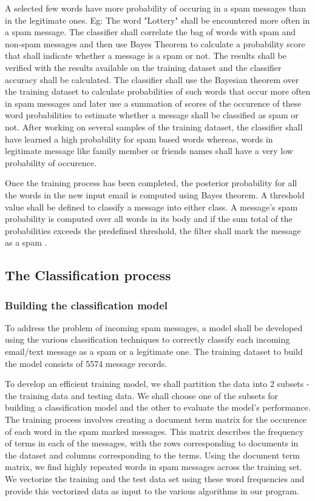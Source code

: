\documentclass[9pt,twocolumn,twoside]{../../styles/osajnl}
\begin{document}
A selected few words have more probability of occuring in a spam
messages than in the legitimate ones. Eg: The word "Lottery" shall be
encountered more often in a spam message.  The classifier shall
correlate the bag of words with spam and non-spam messages and then
use Bayes Theorem to calculate a probability score that shall indicate
whether a message is a spam or not. The results shall be verified with
the results available on the training dataset and the classifier
accuracy shall be calculated.  The classifier shall use the Bayesian
theorem over the training dataset to calculate probabilities of such
words that occur more often in spam messages and later use a summation
of scores of the occurence of these word probabilities to estimate
whether a message shall be classified as spam or not. After working on
several samples of the training dataset, the classifier shall have
learned a high probability for spam based words whereas, words in
legitimate message like family member or friends names shall have a
very low probability of occurence.

Once the training process has been completed, the posterior
probability for all the words in the new input email is computed using
Bayes theorem. A threshold value shall be defined to classify a
message into either class. A message's spam probability is computed
over all words in its body and if the sum total of the probabilities
exceeds the predefined threshold, the filter shall mark the message as
a spam \cite{www-wiki-naivebayes}.

\subsection{The Classification process}

\subsubsection{Building the classification model}

To address the problem of incoming spam messages, a model shall be
developed using the various classification techniques to correctly
classify each incoming email/text message as a spam or a legitimate
one. The training dataset to build the
model consists of 5574 message records.

To develop an efficient training model, we shall partition the data
into 2 subsets - the training data and testing data. We shall choose
one of the subsets for building a classification model and the other
to evaluate the model's performance. The training process involves
creating a document term matrix for the occurence of each word in the
spam marked messages. This matrix describes the frequency of terms in
each of the messages, with the rows corresponding to documents in the
dataset and columns corresponding to the terms.  Using the document
term matrix, we find highly repeated words in spam messages across the
training set. We vectorize the training and the test data set using
these word frequencies and provide this vectorized data as input to
the various algorithms in our program.
\end{document}
